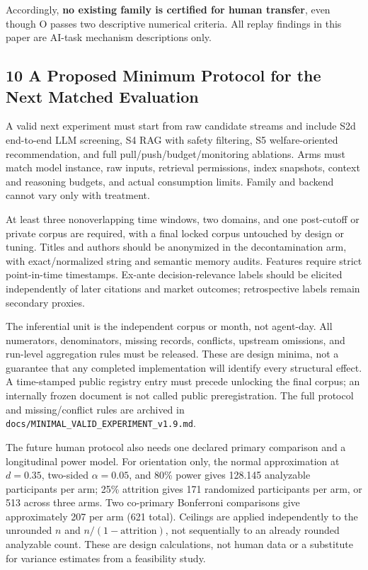 \documentclass[
  11pt]{article}
\begin{document}
Accordingly, \textbf{no existing family is certified for human
transfer}, even though O passes two descriptive numerical criteria. All
replay findings in this paper are AI-task mechanism descriptions only.

\subsection{10 A Proposed Minimum Protocol for the Next Matched
Evaluation}\label{a-proposed-minimum-protocol-for-the-next-matched-evaluation}

A valid next experiment must start from raw candidate streams and
include S2d end-to-end LLM screening, S4 RAG with safety filtering, S5
welfare-oriented recommendation, and full pull/push/budget/monitoring
ablations. Arms must match model instance, raw inputs, retrieval
permissions, index snapshots, context and reasoning budgets, and actual
consumption limits. Family and backend cannot vary only with treatment.

At least three nonoverlapping time windows, two domains, and one
post-cutoff or private corpus are required, with a final locked corpus
untouched by design or tuning. Titles and authors should be anonymized
in the decontamination arm, with exact/normalized string and semantic
memory audits. Features require strict point-in-time timestamps. Ex-ante
decision-relevance labels should be elicited independently of later
citations and market outcomes; retrospective labels remain secondary
proxies.

The inferential unit is the independent corpus or month, not agent-day.
All numerators, denominators, missing records, conflicts, upstream
omissions, and run-level aggregation rules must be released. These are
design minima, not a guarantee that any completed implementation will
identify every structural effect. A time-stamped public registry entry
must precede unlocking the final corpus; an internally frozen document
is not called public preregistration. The full protocol and
missing/conflict rules are archived in
\texttt{docs/MINIMAL\_VALID\_EXPERIMENT\_v1.9.md}.

The future human protocol also needs one declared primary comparison and
a longitudinal power model. For orientation only, the normal
approximation at \(d=0.35\), two-sided \(\alpha=0.05\), and 80\% power
gives 128.145 analyzable participants per arm; 25\% attrition gives 171
randomized participants per arm, or 513 across three arms. Two
co-primary Bonferroni comparisons give approximately 207 per arm (621
total). Ceilings are applied independently to the unrounded \(n\) and
\(n/(1-\text{attrition})\), not sequentially to an already rounded
analyzable count. These are design calculations, not human data or a
substitute for variance estimates from a feasibility study.
\end{document}
